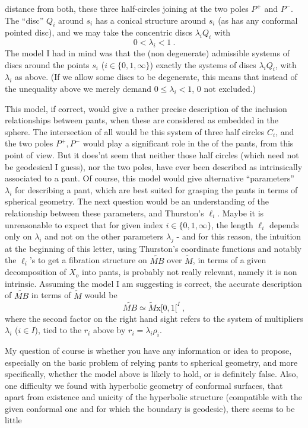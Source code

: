 distance from both, these three half-circles joining at the two poles $P^+$ and $P^-$. The ``disc'' $Q_i$ around $s_i$ has a conical structure around $s_i$ (as has any conformal pointed disc), and we may take the concentric  discs $\lambda_iQ_i$ with
\[
0<\lambda_i<1\ .
\]
The model I had in mind was that the (non degenerate) admissible systems of discs around the points $s_i$ ($i\in\{0,1,\infty\}$)  exactly the systems of discs $\lambda_iQ_i$, with $\lambda_i$ as above. (If we allow some discs to be degenerate, this means that instead of the unequality above we merely demand $0\le\lambda_i<1$, $0$ not excluded.)

This model, if correct, would give a rather precise description of the inclusion relationships between pants, when these are considered as embedded in the sphere. The intersection of all would be this system of three half circles $C_i$, and the two poles $P^+,P^-$ would play a significant role in the  of the pants, from this point of view. But it does'nt seem that neither those half circles (which need not be geodesical I guess), nor the two poles, have ever been described as intrinsically associated to a pant. Of course, this model would give alternative ``parameters'' $\lambda_i$ for describing a pant, which are best suited for grasping the pants in terms of spherical geometry. The next question would be an understanding of the relationship between these parameters, and Thurston's $\ell_i$. Maybe it is unreasonable to expect that for given index $i\in\{0,1,\infty\}$, the length $\ell_i$ depends only on $\lambda_i$ and not on the other parameters $\lambda_j$ - and for this reason,  the intuition at the beginning of this letter, using Thurston's coordinate functions and notably the $\ell_i$'s to get a fibration structure on $\widetilde{MB}$ over $\widetilde M$, in terms of a given decomposition of $X_o$ into pants, is probably not really relevant, namely it is non intrinsic. Assuming the model I am suggesting is correct, the accurate description  of $\widetilde{MB}$ in terms of $\widetilde M$ would be
\[
\widetilde{MB}\simeq\widetilde M\mathbin{\mathrm{x}}[0,1[^I\ ,
\]
where the second factor on the right hand sight refers to the system of multipliers $\lambda_i$ ($i\in I$), tied to the $r_i$ above by $r_i=\lambda_i\rho_i$.

My question of course is whether you have any information or idea to propose, especially on the basic problem of relying pants to spherical geometry, and more specifically, whether the model above is likely to hold, or is definitely false. Also, one difficulty we found with hyperbolic geometry of conformal surfaces, that apart from existence and unicity of the hyperbolic structure (compatible with the given conformal one and for which the boundary is geodesic), there seems to be little
